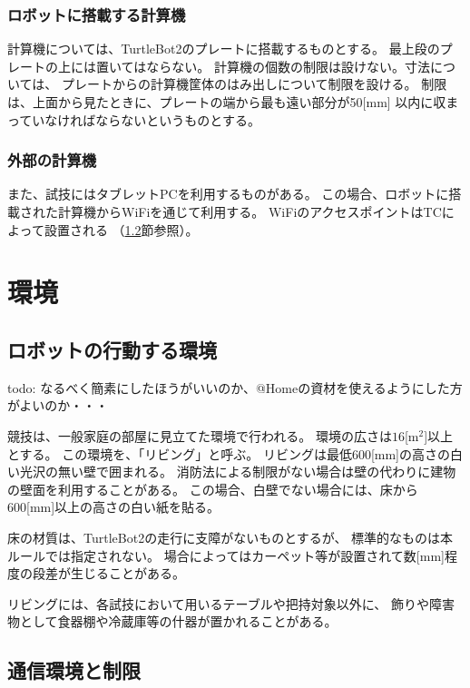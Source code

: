 \documentclass[a4j]{jarticle}
\begin{document}
\subsubsection{ロボットに搭載する計算機}

計算機については、TurtleBot2のプレートに搭載するものとする。
最上段のプレートの上には置いてはならない。
計算機の個数の制限は設けない。寸法については、
プレートからの計算機筐体のはみ出しについて制限を設ける。
制限は、上面から見たときに、プレートの端から最も遠い部分が50[mm]
以内に収まっていなければならないというものとする。

\subsubsection{外部の計算機}

また、試技にはタブレットPCを利用するものがある。
この場合、ロボットに搭載された計算機からWiFiを通じて利用する。
WiFiのアクセスポイントはTCによって設置される
（\ref{sub:network}節参照）。

\section{環境}

\subsection{ロボットの行動する環境}\label{sub:environment}

todo: なるべく簡素にしたほうがいいのか、@Homeの資材を使えるようにした方がよいのか・・・

競技は、一般家庭の部屋に見立てた環境で行われる。
環境の広さは$16$[m$^2$]以上とする。
この環境を、「リビング」と呼ぶ。
リビングは最低600[mm]の高さの白い光沢の無い壁で囲まれる。
消防法による制限がない場合は壁の代わりに建物の壁面を利用することがある。
この場合、白壁でない場合には、床から600[mm]以上の高さの白い紙を貼る。

床の材質は、TurtleBot2の走行に支障がないものとするが、
標準的なものは本ルールでは指定されない。
場合によってはカーペット等が設置されて数[mm]程度の段差が生じることがある。

リビングには、各試技において用いるテーブルや把持対象以外に、
飾りや障害物として食器棚や冷蔵庫等の什器が置かれることがある。

\subsection{通信環境と制限}\label{sub:network}
\end{document}
